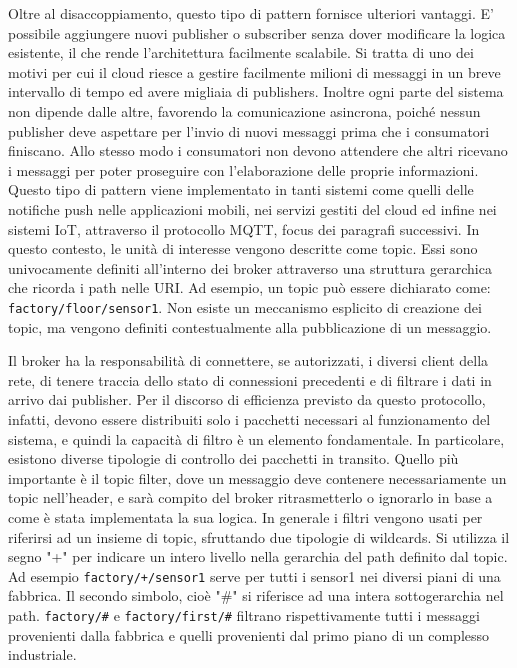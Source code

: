 Oltre al disaccoppiamento, questo tipo di pattern fornisce ulteriori vantaggi\cite{a9IoT4Arch}. E' possibile aggiungere nuovi publisher o subscriber senza dover modificare la logica esistente, il che rende l'architettura facilmente scalabile. Si tratta di uno dei motivi per cui il cloud riesce a gestire facilmente milioni di messaggi in un breve intervallo di tempo ed avere migliaia di publishers. Inoltre ogni parte del sistema non dipende dalle altre, favorendo la comunicazione asincrona, poiché nessun publisher deve aspettare per l'invio di nuovi messaggi prima che i consumatori finiscano. Allo stesso modo i consumatori non devono attendere che altri ricevano i messaggi per poter proseguire con l'elaborazione delle proprie informazioni. Questo tipo di pattern viene implementato in tanti sistemi come quelli delle notifiche push nelle applicazioni mobili, nei servizi gestiti del cloud ed infine nei sistemi IoT, attraverso il protocollo MQTT, focus dei paragrafi successivi. In questo contesto, le unità di interesse vengono descritte come topic. Essi sono univocamente definiti all'interno dei broker attraverso una struttura gerarchica che ricorda i path nelle URI. Ad esempio, un topic può essere dichiarato come: \texttt{factory/floor/sensor1}. Non esiste un meccanismo esplicito di creazione dei topic, ma vengono definiti contestualmente alla pubblicazione di un messaggio.

Il broker ha la responsabilità di connettere, se autorizzati, i diversi client della rete, di tenere traccia dello stato di connessioni precedenti e di filtrare i dati in arrivo dai publisher. Per il discorso di efficienza previsto da questo protocollo, infatti, devono essere distribuiti solo i pacchetti necessari al funzionamento del sistema, e quindi la capacità di filtro è un elemento fondamentale. In particolare, esistono diverse tipologie di controllo dei pacchetti in transito. Quello più importante è il topic filter, dove un messaggio deve contenere necessariamente un topic nell'header, e sarà compito del broker ritrasmetterlo o ignorarlo in base a come è stata implementata la sua logica. In generale i filtri vengono usati per riferirsi ad un insieme di topic, sfruttando due tipologie di wildcards. Si utilizza il segno "+" per indicare un intero livello nella gerarchia del path definito dal topic. Ad esempio \texttt{factory/+/sensor1} serve per tutti i sensor1 nei diversi piani di una fabbrica. Il secondo simbolo, cioè "\#" si riferisce ad una intera sottogerarchia nel path. \texttt{factory/\#} e \texttt{factory/first/\#} filtrano rispettivamente tutti i messaggi provenienti dalla fabbrica e quelli provenienti dal primo piano di un complesso industriale. 

